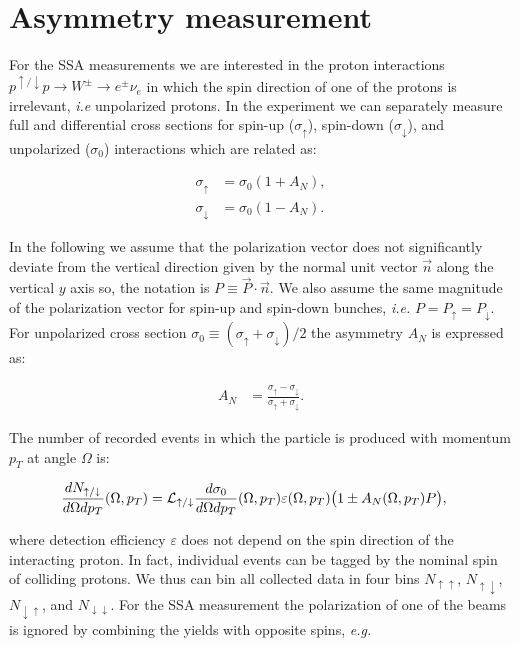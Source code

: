 \documentclass[12pt]{article}
\begin{document}


\section{Asymmetry measurement}

For the SSA measurements we are interested in the proton interactions
$p^{\uparrow/\downarrow} p \to W^\pm \to e^\pm \nu_e$ in which the spin direction of one
of the protons is irrelevant, \textit{i.e} unpolarized protons. In the
experiment we can separately measure full and differential cross sections for
spin-up ($\sigma_\uparrow$), spin-down ($\sigma_\downarrow$), and unpolarized
($\sigma_0$) interactions which are related as:

\begin{align}
\sigma_\uparrow   &= \sigma_0 (1 + A_N ), \\
\sigma_\downarrow &= \sigma_0 (1 - A_N ).
\end{align}

In the following we assume that the polarization vector does not significantly
deviate from the vertical direction given by the normal unit vector $\vec n$
along the vertical $y$ axis so, the notation is $P \equiv \vec{P} \cdot
\vec{n}$. We also assume the same magnitude of the polarization vector for
spin-up and spin-down bunches, \textit{i.e.} $P = P_\uparrow = P_\downarrow$.
For unpolarized cross section $\sigma_0 \equiv (\sigma_\uparrow +
\sigma_\downarrow)/2$ the asymmetry $A_N$ is expressed as:

\begin{align}
\label{eq_anapower}
A_N &= \frac{\sigma_\uparrow - \sigma_\downarrow}{\sigma_\uparrow +
   \sigma_\downarrow}.
\end{align}

The number of recorded events in which the particle is produced with momentum
$p_T$ at angle $\Omega$ is:

\begin{align}
\frac{dN_{\uparrow/\downarrow}}{d\Omega dp_T}(\Omega, p_T) &=
   {\cal L}_{\uparrow/\downarrow} \frac{d\sigma_0}{d\Omega dp_T}(\Omega, p_T)
   \varepsilon(\Omega, p_T) \big( 1 \pm A_N(\Omega, p_T) P \big),
\label{eq:yield_diff}
\end{align}

\noindent
where detection efficiency $\varepsilon$ does not depend on the spin direction
of the interacting proton. In fact, individual events can be tagged by the
nominal spin of colliding protons. We thus can bin all collected data  in four
bins $N_{\uparrow\uparrow}$, $N_{\uparrow\downarrow}$,
$N_{\downarrow\uparrow}$, and $N_{\downarrow\downarrow}$. For the SSA
measurement the polarization of one of the beams is ignored by combining the
yields with opposite spins, \textit{e.g.}
\end{document}
